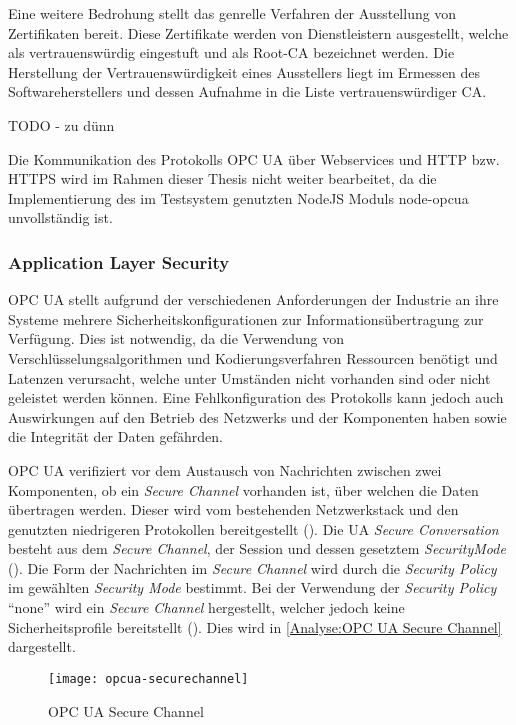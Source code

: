 Eine weitere Bedrohung stellt das genrelle Verfahren der Ausstellung von Zertifikaten bereit. Diese Zertifikate werden von Dienstleistern ausgestellt, welche als vertrauenswürdig eingestuft und als Root-\ac{CA} bezeichnet werden. Die Herstellung der Vertrauenswürdigkeit eines Ausstellers liegt im Ermessen des Softwareherstellers und dessen Aufnahme in die Liste vertrauenswürdiger \ac{CA}.

TODO - zu dünn

Die Kommunikation des Protokolls \ac{OPC UA} über Webservices und \ac{HTTP} bzw. \ac{HTTPS} wird im Rahmen dieser Thesis nicht weiter bearbeitet, da die Implementierung des im Testsystem genutzten NodeJS Moduls node-opcua unvollständig ist.

\subsubsection{Application Layer Security}
\label{Analyse:Application Layer Security}
\ac{OPC UA} stellt aufgrund der verschiedenen Anforderungen der Industrie an ihre Systeme mehrere Sicherheitskonfigurationen zur Informationsübertragung zur Verfügung. Dies ist notwendig, da die Verwendung von Verschlüsselungsalgorithmen und Kodierungsverfahren Ressourcen benötigt und Latenzen verursacht, welche unter Umständen nicht vorhanden sind oder nicht geleistet werden können. Eine Fehlkonfiguration des Protokolls kann jedoch auch Auswirkungen auf den Betrieb des Netzwerks und der Komponenten haben sowie die Integrität der Daten gefährden.

\ac{OPC UA} verifiziert vor dem Austausch von Nachrichten zwischen zwei Komponenten, ob ein \textit{Secure Channel} vorhanden ist, über welchen die Daten übertragen werden. Dieser wird vom bestehenden Netzwerkstack und den genutzten niedrigeren Protokollen bereitgestellt (\cite{opcpt1}). Die \ac{UA} \textit{Secure Conversation} besteht aus dem \textit{Secure Channel}, der Session und dessen gesetztem \textit{SecurityMode} (\cite{opcpt2}). Die Form der Nachrichten im \textit{Secure Channel} wird durch die \textit{Security Policy} im gewählten \textit{Security Mode} bestimmt. Bei der Verwendung der \textit{Security Policy} "`none"' wird ein \textit{Secure Channel} hergestellt, welcher jedoch keine Sicherheitsprofile bereitstellt (\cite{opcpt7}). Dies wird in \autoref{Analyse:OPC UA Secure Channel} dargestellt.

\begin{figure}[h]
  \centering
  \texttt{[image: opcua-securechannel]}
  \caption{OPC UA Secure Channel} 
  \label{Analyse:OPC UA Secure Channel}
\end{figure}

